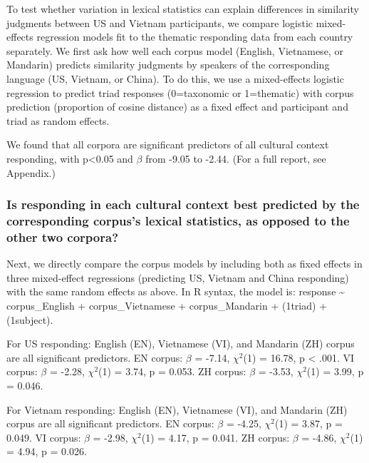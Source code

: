\documentclass[10pt, letterpaper]{article}
\begin{document}
To test whether variation in lexical statistics can explain differences
in similarity judgments between US and Vietnam participants, we compare
logistic mixed-effects regression models fit to the thematic responding
data from each country separately. We first ask how well each corpus
model (English, Vietnamese, or Mandarin) predicts similarity judgments
by speakers of the corresponding language (US, Vietnam, or China). To do
this, we use a mixed-effects logistic regression to predict triad
responses (0=taxonomic or 1=thematic) with corpus prediction (proportion
of cosine distance) as a fixed effect and participant and triad as
random effects.

We found that all corpora are significant predictors of all cultural
context responding, with p\textless0.05 and \(\beta\) from -9.05 to
-2.44. (For a full report, see Appendix.)

\hypertarget{is-responding-in-each-cultural-context-best-predicted-by-the-corresponding-corpuss-lexical-statistics-as-opposed-to-the-other-two-corpora}{%
\subsubsection{Is responding in each cultural context best predicted by
the corresponding corpus's lexical statistics, as opposed to the other
two
corpora?}\label{is-responding-in-each-cultural-context-best-predicted-by-the-corresponding-corpuss-lexical-statistics-as-opposed-to-the-other-two-corpora}}

Next, we directly compare the corpus models by including both as fixed
effects in three mixed-effect regressions (predicting US, Vietnam and
China responding) with the same random effects as above. In R syntax,
the model is: response \textasciitilde{} corpus\_English +
corpus\_Vietnamese + corpus\_Mandarin + (1\textbar triad) +
(1\textbar subject).

For US responding: English (EN), Vietnamese (VI), and Mandarin (ZH)
corpus are all significant predictors. EN corpus: \(\beta\) = -7.14,
\(\chi^2\)(1) = 16.78, p \textless{} .001. VI corpus: \(\beta\) = -2.28,
\(\chi^2\)(1) = 3.74, p = 0.053. ZH corpus: \(\beta\) = -3.53,
\(\chi^2\)(1) = 3.99, p = 0.046.

For Vietnam responding: English (EN), Vietnamese (VI), and Mandarin (ZH)
corpus are all significant predictors. EN corpus: \(\beta\) = -4.25,
\(\chi^2\)(1) = 3.87, p = 0.049. VI corpus: \(\beta\) = -2.98,
\(\chi^2\)(1) = 4.17, p = 0.041. ZH corpus: \(\beta\) = -4.86,
\(\chi^2\)(1) = 4.94, p = 0.026.
\end{document}
